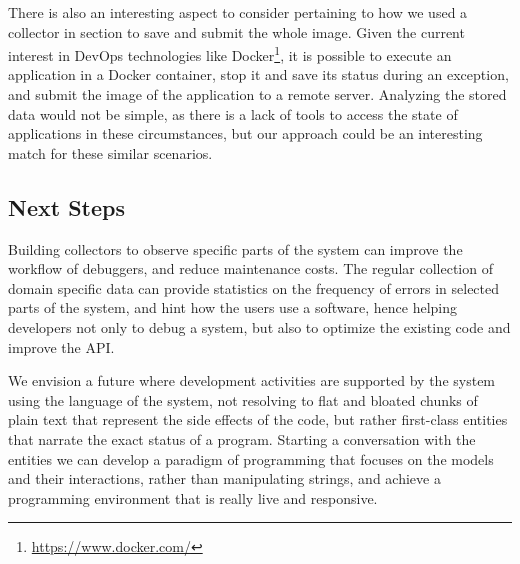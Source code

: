 There is also an interesting aspect to consider pertaining to how we used a collector in section  to save and submit the whole \pha image.
Given the current interest in DevOps technologies like Docker\footnote{\url{https://www.docker.com/}}, it is possible to execute an application in a Docker container, stop it and save its status during an exception, and submit the image of the application to a remote server.
Analyzing the stored data would not be simple, as there is a lack of tools to access the state of applications in these circumstances, but our approach could be an interesting match for these similar scenarios.


\subsection{Next Steps}

Building collectors to observe specific parts of the system can improve the workflow of debuggers, and reduce maintenance costs.
The regular collection of domain specific data can provide statistics on the frequency of errors in selected parts of the system, and hint how the users use a software, hence helping developers not only to debug a system, but also to optimize the existing code and improve the API.

We envision a future where development activities are supported by the system using the language of the system, not resolving to flat and bloated chunks of plain text that represent the side effects of the code, but rather first-class entities that narrate the exact status of a program.
Starting a conversation with the entities we can develop a paradigm of programming that focuses on the models and their interactions, rather than manipulating strings, and achieve a programming environment that is really live and responsive.
